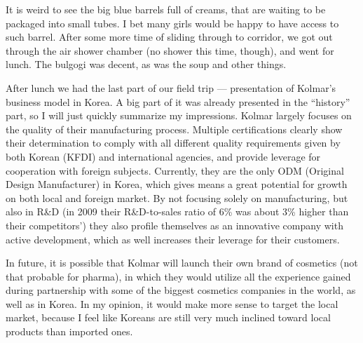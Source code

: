\begin{post}
\begin{content}


It is weird to see the big blue barrels full of creams, that are waiting to be packaged into small tubes. I bet many girls would be happy to have access to such barrel. After some more time of sliding through to corridor, we got out through the air shower chamber (no shower this time, though), and went for lunch. The bulgogi was decent, as was the soup and other things.


After lunch we had the last part of our field trip — presentation of Kolmar's business model in Korea. A big part of it was already presented in the ``history'' part, so I will just quickly summarize my impressions. Kolmar largely focuses on the quality of their manufacturing process. Multiple certifications clearly show their determination to comply with all different quality requirements given by both Korean (KFDI) and international agencies, and provide leverage for cooperation with foreign subjects. Currently, they are the only ODM (Original Design Manufacturer) in Korea, which gives means a great potential for growth on both local and foreign market. By not focusing solely on manufacturing, but also in R\&D (in 2009 their R\&D-to-sales ratio of 6\% was about 3\% higher than their competitors') they also profile themselves as an innovative company with active development, which as well increases their leverage for their customers.

In future, it is possible that Kolmar will launch their own brand of cosmetics (not that probable for pharma), in which they would utilize all the experience gained during partnership with some of the biggest cosmetics companies in the world, as well as in Korea. In my opinion, it would make more sense to target the local market, because I feel like Koreans are still very much inclined toward local products than imported ones.


\end{content}
\end{post}
